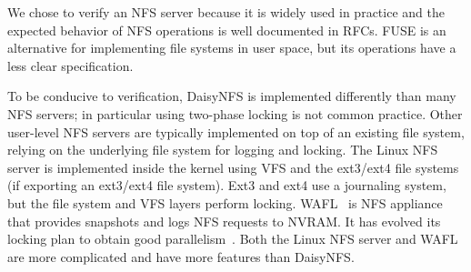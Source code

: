 We chose to verify an NFS server because it is widely used in practice
and the expected behavior of NFS operations is well documented in
RFCs.  FUSE is an alternative for implementing file systems in user
space, but its operations have a less clear specification.

To be conducive to verification, DaisyNFS is implemented differently than
many NFS servers; in particular using two-phase locking is not common
practice.  Other user-level NFS servers are typically implemented on
top of an existing file system, relying on the underlying file system
for logging and locking. The Linux NFS server is implemented inside
the kernel using VFS and the ext3/ext4 file systems (if exporting an
ext3/ext4 file system).  Ext3 and ext4 use a journaling system, but
the file system and VFS layers perform locking.  WAFL~\cite{wafl:hitz}
is NFS appliance that provides snapshots and logs NFS requests to
NVRAM.  It has evolved its locking plan to obtain good
parallelism~\cite{curtis:wafl}.  Both the Linux NFS server and WAFL
are more complicated and have more features than DaisyNFS.

